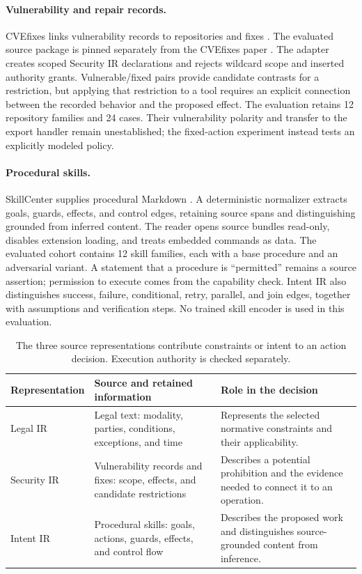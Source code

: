 \documentclass{article}
\begin{document}
\paragraph{Vulnerability and repair records.}
CVEfixes links vulnerability records to repositories and fixes \citep{cvefixes}. The evaluated source package is pinned separately from the CVEfixes paper \citep{cvefixes-source}. The adapter creates scoped Security IR declarations and rejects wildcard scope and inserted authority grants. Vulnerable/fixed pairs provide candidate contrasts for a restriction, but applying that restriction to a tool requires an explicit connection between the recorded behavior and the proposed effect. The evaluation retains 12 repository families and 24 cases. Their vulnerability polarity and transfer to the export handler remain unestablished; the fixed-action experiment instead tests an explicitly modeled policy.

\paragraph{Procedural skills.}
SkillCenter supplies procedural Markdown \citep{skillcenter-source}. A deterministic normalizer extracts goals, guards, effects, and control edges, retaining source spans and distinguishing grounded from inferred content. The reader opens source bundles read-only, disables extension loading, and treats embedded commands as data. The evaluated cohort contains 12 skill families, each with a base procedure and an adversarial variant. A statement that a procedure is ``permitted'' remains a source assertion; permission to execute comes from the capability check. Intent IR also distinguishes success, failure, conditional, retry, parallel, and join edges, together with assumptions and verification steps. No trained skill encoder is used in this evaluation.

\begin{table}[t]
\centering
\caption{The three source representations contribute constraints or intent to an action decision. Execution authority is checked separately.}
\label{tab:1}
\begin{tabular}{@{}>{\raggedright\arraybackslash}p{.18\linewidth} >{\raggedright\arraybackslash}p{.36\linewidth} >{\raggedright\arraybackslash}p{.40\linewidth}@{}}
\toprule
Representation & Source and retained information & Role in the decision \\
\midrule
Legal IR & Legal text: modality, parties, conditions, exceptions, and time & Represents the selected normative constraints and their applicability. \\[4pt]
Security IR & Vulnerability records and fixes: scope, effects, and candidate restrictions & Describes a potential prohibition and the evidence needed to connect it to an operation. \\[4pt]
Intent IR & Procedural skills: goals, actions, guards, effects, and control flow & Describes the proposed work and distinguishes source-grounded content from inference. \\
\bottomrule
\end{tabular}
\end{table}
\end{document}
